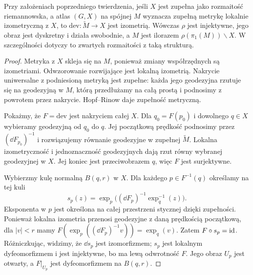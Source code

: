 \begin{stwierdzenie}
\label{prop:thur-dop-dev-kompletna}
Przy założeniach poprzedniego twierdzenia, jeśli $X$ jest zupełna jako rozmaitość
riemannowska, a atlas $(G,X)$ na spójnej $M$ wyznacza
zupełną metrykę lokalnie izometryczną z $X$, to
$\mathrm{dev}:\widetilde M\to X$ jest izometrią.
Wówczas $\rho$ jest injektywne, jego obraz jest dyskretny
i działa swobodnie, a $M$ jest ilorazem
$\rho(\pi_1(M))\backslash X$. W szczególności dotyczy to
zwartych rozmaitości z taką strukturą.
\end{stwierdzenie}
\begin{proof}
Metryka z $X$ skleja się na $M$, ponieważ zmiany
współrzędnych są izometriami. Odwzorowanie rozwijające
jest lokalną izometrią. Nakrycie uniwersalne z podniesioną
metryką jest zupełne: każda jego geodezyjna rzutuje się na
geodezyjną w $M$, którą przedłużamy na całą prostą i podnosimy
z powrotem przez nakrycie. Hopf--Rinow daje zupełność metryczną.

Pokażmy, że $F=\mathrm{dev}$ jest nakryciem całej $X$.
Dla $q_0=F(p_0)$ i dowolnego $q\in X$ wybieramy geodezyjną
od $q_0$ do $q$. Jej początkową prędkość podnosimy przez
$(\dd F_{p_0})^{-1}$ i rozwiązujemy równanie geodezyjne
w zupełnej $\widetilde M$. Lokalna izometryczność i jednoznaczność
geodezyjnych dają rzut równy wybranej geodezyjnej w $X$.
Jej koniec jest przeciwobrazem $q$, więc $F$ jest surjektywne.

Wybierzmy kulę normalną $B(q,r)$ w $X$. Dla każdego
$p\in F^{-1}(q)$ określamy na tej kuli
\[
 s_p(z)=\exp_p\bigl((\dd F_p)^{-1}\exp_q^{-1}(z)\bigr).
\]
Eksponenta w $p$ jest określona na całej przestrzeni stycznej
dzięki zupełności. Ponieważ lokalna izometria przenosi
geodezyjne z daną prędkością początkową, dla $|v|<r$ mamy
$F(\exp_p((\dd F_p)^{-1}v))=\exp_q(v)$.
Zatem $F\circ s_p=\mathrm{id}$.
Różniczkując, widzimy, że $\dd s_p$ jest izomorfizmem;
$s_p$ jest lokalnym dyfeomorfizmem i jest injektywne,
bo ma lewą odwrotność $F$. Jego obraz $U_p$ jest otwarty,
a $F|_{U_p}$ jest dyfeomorfizmem na $B(q,r)$.


\end{proof}
